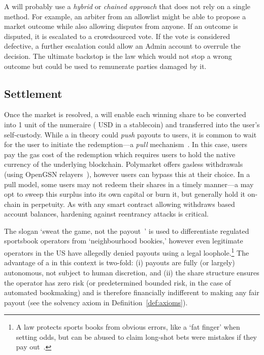 A \depm will probably use a \textit{hybrid} or \textit{chained approach} that does not rely on a single method. For example, an arbiter from an allowlist might be able to propose a market outcome while also allowing disputes from anyone. If an outcome is disputed, it is escalated to a crowdsourced vote. If the vote is considered defective, a further escalation could allow an Admin account to overrule the decision. The ultimate backstop is the law which would not stop a wrong outcome but could be used to remunerate parties damaged by it.



\subsection{Settlement}\label{wf:clear}

Once the market is resolved, a \depm will enable each winning share to be converted into 1 unit of the numeraire ( USD in a stablecoin) and transferred into the user's self-custody. While a \depm in theory could \textit{push} payouts to users, it is common to wait for the user to initiate the redemption---a \textit{pull} mechanism~\cite{ctf}. In this case, users pay the gas cost of the redemption which requires users to hold the native currency of the underlying blockchain. Polymarket offers gasless withdrawals (using OpenGSN relayers~\cite{gsn}), however users can bypass this at their choice. In a pull model, some users may not redeem their shares in a timely manner---a \depm may opt to sweep this surplus into its own capital or burn it, but \depms generally hold it on-chain in perpetuity. As with any smart contract allowing withdraws based account balances, hardening against reentrancy attacks is critical.

The slogan `sweat the game, not the payout~\cite{Fu24}' is used to differentiate regulated sportsbook operators from `neighbourhood bookies,' however even legitimate operators in the US have allegedly denied payouts using a legal loophole.\footnote{A law protects sports books from obvious errors, like a `fat finger' when setting odds, but can be abused to claim long-shot bets were mistakes if they pay out~\cite{Fu24}.} The advantage of a \depm in this context is two-fold: (i) payouts are fully (or largely) autonomous, not subject to human discretion, and (ii) the share structure ensures the operator has zero risk (or predetermined bounded risk, in the case of automated bookmaking) and is therefore financially indifferent to making any fair payout (see the solvency axiom in Definition~\ref{def:axioms}). 


